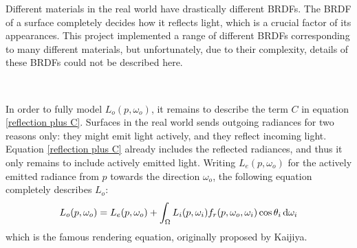 Different materials in the real world have drastically different BRDFs. The BRDF of a surface completely decides how it reflects light, which is a crucial factor of its appearances. This project implemented a range of different BRDFs corresponding to many different materials, but unfortunately, due to their complexity, details of these BRDFs could not be described here. 

~

In order to fully model $L_o(p,\omega_o)$, it remains to describe the term $C$ in equation \ref{reflection plus C}. Surfaces in the real world sends outgoing radiances for two reasons only: they might emit light actively, and they reflect incoming light. Equation \ref{reflection plus C} already includes the reflected radiances, and thus it only remains to include actively emitted light. Writing $L_e(p,\omega_o)$ for the actively emitted radiance from $p$ towards the direction $\omega_o$, the following equation completely describes $L_o$:
\begin{align}
    L_o(p,\omega_o) = L_e(p,\omega_o) + \int_\Omega L_i(p,\omega_i)f_r(p,\omega_o,\omega_i)\cos\theta_i\,\mathrm{d}\omega_i
    \label{rendering equation}
\end{align}
which is the famous rendering equation, originally proposed by Kaijiya\cite{rendering_equation}. 


